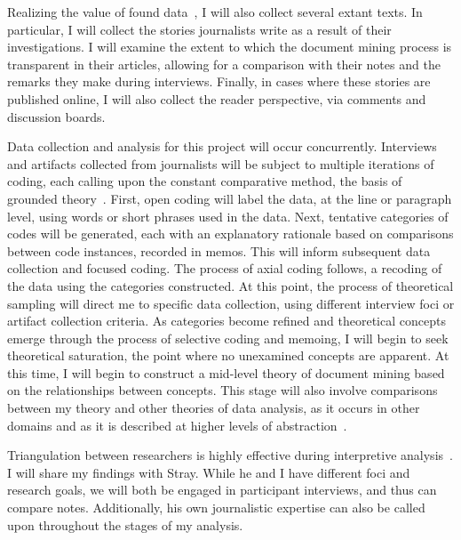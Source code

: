 Realizing the value of found data~\cite{Silverman2007}, I will also collect several extant texts. 
In particular, I will collect the stories journalists write as a result of their investigations. 
I will examine the extent to which the document mining process is transparent in their articles, allowing for a comparison with their notes and the remarks they make during interviews. 
Finally, in cases where these stories are published online, I will also collect the reader perspective, via comments and discussion boards.

Data collection and analysis for this project will occur concurrently. 
Interviews and artifacts collected from journalists will be subject to multiple iterations of coding, each calling upon the constant comparative method, the basis of grounded theory~\cite{Charmaz2006}. 
First, open coding will label the data, at the line or paragraph level, using words or short phrases used in the data. 
Next, tentative categories of codes will be generated, each with an explanatory rationale based on comparisons between code instances, recorded in memos. 
This will inform subsequent data collection and focused coding. 
The process of axial coding follows, a recoding of the data using the categories constructed. 
At this point, the process of theoretical sampling will direct me to specific data collection, using different interview foci or artifact collection criteria. 
As categories become refined and theoretical concepts emerge through the process of selective coding and memoing, I will begin to seek theoretical saturation, the point where no unexamined concepts are apparent. 
At this time, I will begin to construct a mid-level theory of document mining based on the relationships between concepts. 
This stage will also involve comparisons between my theory and other theories of data analysis, as it occurs in other domains and as it is described at higher levels of abstraction~\cite{Amar2004,Pirolli2009}.

Triangulation between researchers is highly effective during interpretive analysis~\cite{Mathison1988}. 
I will share my findings with Stray. 
While he and I have different foci and research goals, we will both be engaged in participant interviews, and thus can compare notes. 
Additionally, his own journalistic expertise can also be called upon throughout the stages of my analysis.

